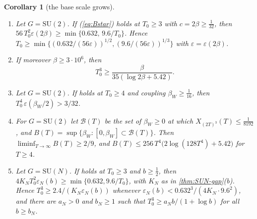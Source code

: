 \documentclass[11pt,a4paper]{amsart}
\newtheorem{corollary}[theorem]{Corollary}
\theoremstyle{definition}
\theoremstyle{remark}
\numberwithin{equation}{section}
\newcommand{\SU}{\mathrm{SU}}              %
\newcommand{\TT}{\mathbb{T}}               %
\newcommand{\Zc}{\mathcal{Z}}              %
\newcommand{\XT}[2]{X_{#1}(#2)}            %
\newcommand{\cube}[1]{(2#1)^3}             %
\newcommand{\xconst}{\frac{1}{8192}}       %
\newcommand{\Bcirc}{\text{\upshape(B$^{\circ}$)}}   %
\newcommand{\Bstar}{\text{\upshape(B$^{*}$)}}       %
\newcommand{\betaW}{\beta_{W}}             %
\begin{document}
\begin{corollary}[the base scale grows]\label{cor:base-scale}
\leavevmode
\begin{enumerate}[label=\textup{(\alph*)},leftmargin=*]
\item Let $G=\SU(2)$. If \Bstar{} \textup{(}\cref{eq:Bstar}\textup{)} holds at $T_0\ge3$ with $c=2\beta\ge\frac1{32}$, then $56\,T_0^2\varepsilon(2\beta)\ge\min\{0.632,\,9.6/T_0\}$. Hence $T_0\ge\min\{(0.632/(56\varepsilon))^{1/2},(9.6/(56\varepsilon))^{1/3}\}$ with $\varepsilon=\varepsilon(2\beta)$.
\item If moreover $\beta\ge3\cdot10^6$, then
\[
T_0^3\ge\frac{\beta}{35(\log2\beta+5.42)} .
\]
\item Let $G=\SU(2)$. If \Bcirc{} holds at $T_0\ge4$ and coupling $\betaW\ge\frac1{16}$, then $T_0^4\,\varepsilon(\betaW/2)>3/32$.
\item For $G=\SU(2)$ let $\mathcal B(T)$ be the set of $\betaW\ge0$ at which $\XT{\cube T}{T}\le\xconst$, and $B(T)=\sup\{\betaW:[0,\betaW]\subset\mathcal B(T)\}$. Then $\liminf_{T\to\infty}B(T)\ge2/9$, and $B(T)\le256\,T^4\bigl(2\log(128T^4)+5.42\bigr)$ for $T\ge4$.
\item Let $G=\SU(N)$. If \Bstar{} holds at $T_0\ge3$ and $b\ge\frac12$, then $4K_NT_0^2\varepsilon_N(b)\ge\min\{0.632,9.6/T_0\}$, with $K_N$ as in \cref{thm:SUN-gap}(b). Hence $T_0^3\ge2.4/(K_N\varepsilon_N(b))$ whenever $\varepsilon_N(b)<0.632^3/(4K_N\cdot9.6^2)$, and there are $a_N>0$ and $b_N\ge1$ such that $T_0^3\ge a_Nb/(1+\log b)$ for all $b\ge b_N$.
\end{enumerate}
\end{corollary}
\end{document}
